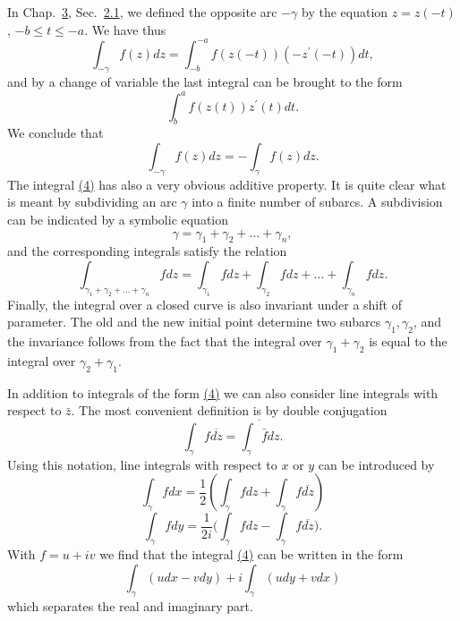 In Chap.~\hyperref[chap:3]{3}, Sec.~\hyperref[sec:3.2.1]{2.1}, we defined the opposite arc $-\gamma$ by the equation $z = z(-t)$, $-b \leq t \leq -a$. We have thus
\begin{equation*}
\int_ {- \gamma} f (z) d z = \int_ {- b} ^ {- a} f (z (- t)) (- z ^ {\prime} (- t)) d t,
\end{equation*}
and by a change of variable the last integral can be brought to the form
\begin{equation*}
\int_ {b} ^ {a} f (z (t)) z ^ {\prime} (t) d t.
\end{equation*}
We conclude that
\begin{equation*}
\int_ {- \gamma} f (z) d z = - \int_ {\gamma} f (z) d z.\tag{5}\label{eq:4.5}
\end{equation*}
The integral \hyperref[eq:4.4]{(4)} has also a very obvious additive property. It is quite clear what is meant by subdividing an arc $\gamma$ into a finite number of subarcs. A subdivision can be indicated by a symbolic equation
\begin{equation*}
\gamma = \gamma_ {1} + \gamma_ {2} + \dots + \gamma_ {n},
\end{equation*}
and the corresponding integrals satisfy the relation
\begin{equation*}
\int_ {\gamma_ {1} + \gamma_ {2} + \dots + \gamma_ {n}} f d z = \int_ {\gamma_ {1}} f d z + \int_ {\gamma_ {2}} f d z + \dots + \int_ {\gamma_ {n}} f d z.\tag{6}\label{eq:4.6}
\end{equation*}
Finally, the integral over a closed curve is also invariant under a shift of parameter. The old and the new initial point determine two subarcs $\gamma_{1}, \gamma_{2}$, and the invariance follows from the fact that the integral over $\gamma_{1} + \gamma_{2}$ is equal to the integral over $\gamma_{2} + \gamma_{1}$.

In addition to integrals of the form \hyperref[eq:4.4]{(4)} we can also consider line integrals with respect to $\bar{z}$. The most convenient definition is by double conjugation
\begin{equation*}
\int_ {\gamma} f \overline {{d z}} = \overline {{\int_ {\gamma} \bar {f} d z}}.
\end{equation*}
Using this notation, line integrals with respect to $x$ or $y$ can be introduced by
\begin{equation*}
\int_ {\gamma} f d x = \frac {1}{2} \left(\int_ {\gamma} f d z + \int_ {\gamma} f \overline {{d z}}\right)
\end{equation*}
\begin{equation*}
\int_ {\gamma} f d y = \frac {1}{2 i} \Big (\int_ {\gamma} f d z - \int_ {\gamma} f \overline {{d z}} \Big).
\end{equation*}
With $f = u + iv$ we find that the integral \hyperref[eq:4.4]{(4)} can be written in the form
\begin{equation*}
\int_ {\gamma} (u d x - v d y) + i \int_ {\gamma} (u d y + v d x)\tag{7}\label{eq:4.7}
\end{equation*}
which separates the real and imaginary part.

